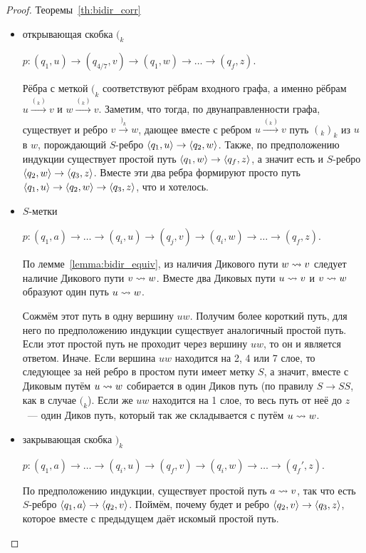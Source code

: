 \begin{proof}{Теоремы~\ref{th:bidir_corr}}
  \begin{itemize}
    \item открывающая скобка $(_k$

      $p \colon (q_1, u) \rightarrow (q_{4/7}, v) \rightarrow (q_1, w) \rightarrow \dots \rightarrow (q_f, z)$.

      Рёбра с меткой $(_k$ соответствуют рёбрам входного графа, а именно рёбрам $u \xrightarrow{(_k)} v$ и $w \xrightarrow{(_k)} v$. Заметим, что тогда, по двунаправленности графа, существует и ребро $v \xrightarrow{)_k} w$, дающее вместе с ребром $u \xrightarrow{(_k)} v $ путь $(_k )_k$ из $u$ в $w$, порождающий $S$-ребро $\langle q_1, u \rangle \rightarrow \langle q_2, w \rangle$. Также, по предположению индукции существует простой путь $\langle q_1, w \rangle \rightarrow \langle q_f, z \rangle$, а значит есть и $S$-ребро $\langle q_2, w \rangle \rightarrow \langle q_3, z \rangle$. Вместе эти два ребра формируют просто путь $\langle q_1, u \rangle \rightarrow \langle q_2, w \rangle \rightarrow \langle q_3, z \rangle$, что и хотелось.

    \item $S$-метки

      $p \colon (q_1, a) \rightarrow \dots \rightarrow (q_i, u) \rightarrow (q_j, v) \rightarrow (q_i, w) \rightarrow \dots \rightarrow (q_f, z)$.

      По лемме~\ref{lemma:bidir_equiv}, из наличия Дикового пути $w \rightsquigarrow v$ следует наличие Дикового пути $v \rightsquigarrow w$. Вместе два Диковых пути $u \rightsquigarrow v$ и $v \rightsquigarrow w$ образуют один путь $u \rightsquigarrow w$. 

      Сожмём этот путь в одну вершину $uw$. Получим более короткий путь, для него по предположению индукции существует аналогичный простой путь. Если этот простой путь не проходит через вершину $uw$, то он и является ответом. Иначе. Если вершина $uw$ находится на 2, 4 или 7 слое, то следующее за ней ребро в простом пути имеет метку $S$, а значит, вместе с Диковым путём $u \rightsquigarrow w$ собирается в один Диков путь (по правилу $S \to SS$, как в случае $(_k$). Если же $uw$ находится на 1 слое, то весь путь от неё до $z$~--- один Диков путь, который так же складывается с путём $u \rightsquigarrow w$.  

    \item закрывающая скобка $)_k$

      $p \colon (q_1, a) \rightarrow \dots \rightarrow (q_i, u) \rightarrow (q_f, v) \rightarrow (q_i, w) \rightarrow \dots \rightarrow (q_f', z)$.

      По предположению индукции, существует простой путь $a \rightsquigarrow v$, так что есть $S$-ребро $\langle q_1, a \rangle \rightarrow \langle q_2, v \rangle$. Поймём, почему будет и ребро $\langle q_2, v \rangle \rightarrow \langle q_3, z \rangle$, которое вместе с предыдущем даёт искомый простой путь.


\end{itemize}
\end{proof}

